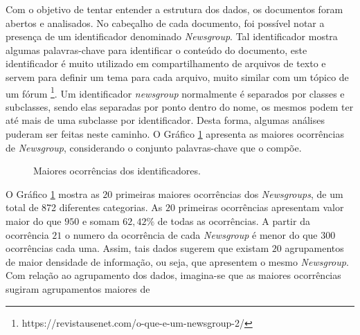 \documentclass[conference]{IEEEtran}
\begin{document}
Com o objetivo de tentar entender a estrutura dos dados, os documentos foram abertos e analisados. No cabeçalho de cada documento, foi possível notar a presença de um identificador denominado \emph{Newsgroup}. Tal identificador mostra algumas palavras-chave para identificar o conteúdo do documento, este identificador é muito utilizado em compartilhamento de arquivos de texto e servem para definir um tema para cada arquivo, muito similar com um tópico de um fórum \footnote{https://revistausenet.com/o-que-e-um-newsgroup-2/}. Um identificador \emph{newsgroup} normalmente é separados por classes e subclasses, sendo elas separadas por ponto dentro do nome, os mesmos podem ter até mais de uma subclasse por identificador. Desta forma, algumas análises puderam ser feitas neste caminho. O Gráfico \ref{fig:occurrence} apresenta as maiores ocorrências de \emph{Newsgroup}, considerando o conjunto palavras-chave que o compõe.

\begin{figure}[!h]
	\centering
	{
	}
	\caption{\small Maiores ocorrências dos identificadores.}
	\label{fig:occurrence}
\end{figure}

O Gráfico \ref{fig:occurrence} mostra as $20$ primeiras maiores ocorrências dos \emph{Newsgroups}, de um total de 872 diferentes categorias. As $20$ primeiras ocorrências apresentam valor maior do que $950$ e somam $62,42\%$ de todas as ocorrências. A partir da ocorrência $21$ o numero da ocorrência de cada \emph{Newsgroup} é menor do que $300$ ocorrências cada uma. Assim, tais dados sugerem que existam $20$ agrupamentos de maior densidade de informação, ou seja, que apresentem o mesmo \emph{Newsgroup}. Com relação ao agrupamento dos dados, imagina-se que as maiores ocorrências sugiram agrupamentos maiores de 
\end{document}
